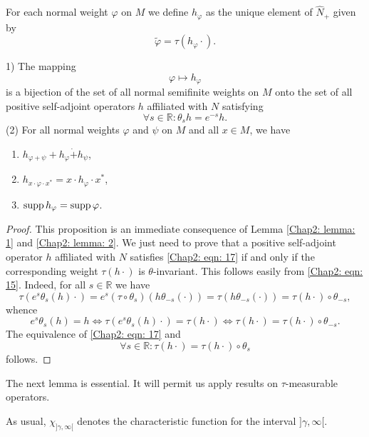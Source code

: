 \begin{definition}
    For each normal weight $\varphi$ on $M$ we define $h_\varphi$ as the unique element of $\hat{N}_+$ given by
    \begin{equation}
        \tilde{\varphi}=\tau(h_\varphi\cdot).
    \end{equation}
\end{definition}
\begin{proposition}\label{Chap2: Prop: 4}
    1) The mapping
    \[
        \varphi\mapsto h_\varphi
    \]
    is a bijection of the set of all normal semifinite weights on $M$ onto the set of all positive self-adjoint operators $h$ affiliated with $N$ satisfying
    \begin{equation}\label{Chap2: eqn: 17}
        \forall s\in \mathbb{R}:\theta_sh=e^{-s}h.
    \end{equation}
    (2) For all normal weights $\varphi$ and $\psi$ on $M$ and all $x\in M$, we have
    \begin{enumerate}
        \item $h_{\varphi+\psi}+h_\varphi\dot{+}h_\psi$,
        \item $h_{x\cdot \varphi \cdot x^*}=x\cdot h_\varphi\cdot x^*$,
        \item $\operatorname{supp} h_\varphi=\operatorname{supp}\varphi$.
    \end{enumerate}
\end{proposition}
\begin{proof}
    This proposition is an immediate consequence of Lemma \ref{Chap2: lemma: 1} and \ref{Chap2: lemma: 2}. We just need to prove that a positive self-adjoint operator $h$ affiliated with $N$ satisfies \eqref{Chap2: eqn: 17} if and only if the corresponding weight $\tau(h\cdot)$ is $\theta$-invariant. This follows easily from \eqref{Chap2: eqn: 15}. Indeed, for all $s\in \mathbb{R}$ we have
    \[
        \tau(e^s\theta_s(h)\cdot)=e^s(\tau\circ \theta_s)(h\theta_{-s}(\cdot))=\tau(h\theta_{-s}(\cdot))=\tau(h\cdot )\circ \theta_{-s},
    \]
    whence
    \[
        e^s\theta_s(h)=h\Leftrightarrow \tau(e^s\theta_s(h)\cdot)=\tau(h\cdot)\Leftrightarrow \tau(h\cdot)=\tau(h\cdot)\circ \theta_{-s}.
    \]
    The equivalence of \eqref{Chap2: eqn: 17} and
    \[
        \forall s\in \mathbb{R}:\tau(h\cdot)=\tau(h\cdot)\circ \theta_s
    \]
    follows.
\end{proof}
The next lemma is essential. It will permit us apply results on $\tau$-measurable operators.\par
As usual, $\chi_{]\gamma,\infty[}$ denotes the characteristic function for the interval $]\gamma,\infty[$.
